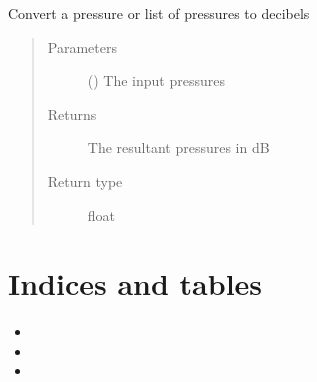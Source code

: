 \documentclass[letterpaper,10pt,english]{sphinxmanual}
\begin{document}
\begin{fulllineitems}
\label{\detokenize{source/pyzones:pyzones.convert_to_db}}
Convert a pressure or list of pressures to decibels
\begin{quote}\begin{description}
\item[{Parameters}] \leavevmode
{} () \textendash{} The input pressures

\item[{Returns}] \leavevmode
The resultant pressures in dB

\item[{Return type}] \leavevmode
float

\end{description}\end{quote}

\end{fulllineitems}



\chapter{Indices and tables}
\label{\detokenize{index:indices-and-tables}}\begin{itemize}
\item {} 

\item {} 

\item {} 

\end{itemize}


\renewcommand{\indexname}{Python Module Index}
\begin{sphinxtheindex}
\let\bigletter\sphinxstyleindexlettergroup
\bigletter{p}
\item\relax{}
\end{sphinxtheindex}

\renewcommand{\indexname}{Index}
\printindex
\end{document}
